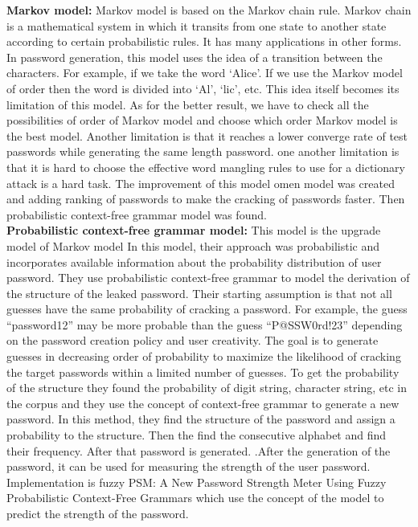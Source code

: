 \documentclass[runningheads]{llncs}
\newcommand{\singlequotes}[1]{`#1'}
\begin{document}
\textbf{Markov model:} Markov model is based on the Markov chain rule. Markov chain is a mathematical system in which it transits from one state to another state according to certain probabilistic rules. It has many applications in other forms. In password generation, this model uses the idea of a transition between the characters. For example, if we take the word \singlequotes{Alice}. If we use the Markov model of  order then the word is divided into \singlequotes{Al}, \singlequotes{lic}, etc. This idea itself becomes its limitation of this model. As for the better result, we have to check all the possibilities of order of Markov model and choose which order Markov model is the best model. Another limitation is that it reaches a lower converge rate of test passwords while generating the same length password. one another limitation is that it is hard to choose the effective word mangling rules to use for a dictionary attack is a hard task. The improvement of this model omen model\cite{10.1007/978-3-319-15618-7_10} was created and adding ranking of passwords to make the cracking of passwords faster.
Then probabilistic context-free grammar model\cite{5207658} was found.
\newline 
\\
\textbf{Probabilistic context-free grammar model:}
This model is the upgrade model of Markov model In this model, their approach was probabilistic and incorporates available information about the probability distribution of user password. They use probabilistic context-free grammar to model the derivation of the structure of the leaked password.
Their starting assumption is that not all guesses have the same probability of cracking a password. For example, the guess “password12” may be more probable than the guess “P@SSW0rd!23” depending on the password creation policy and user creativity. The goal is to generate guesses in decreasing order of probability to maximize the likelihood of cracking the target passwords within a limited number of guesses. To get the probability of the structure they found the probability of digit string, character string, etc in the corpus and they use the concept of context-free grammar to generate a new password. In this method, they find the structure of the password and assign a probability to the structure. Then the find the consecutive alphabet and find their frequency. After that password is generated. \cite{7098389}.After the generation of the password, it can be used for measuring the strength of the user password. Implementation is fuzzy PSM: A New Password Strength Meter Using Fuzzy Probabilistic Context-Free Grammars which use the concept of the model to predict the strength of the password.\cite{7579775}
\end{document}
